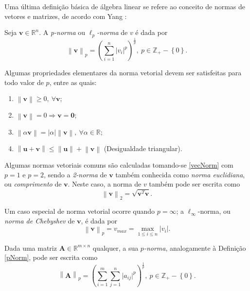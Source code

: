 Uma \'{u}ltima defini\c{c}\~{a}o b\'{a}sica de \'{a}lgebra linear se refere ao conceito de normas de vetores e matrizes, de acordo com Yang \cite{yang}:

\begin{definition} \label{pNorm}
Seja $\mathbf{v} \in \mathbb{R}^{n}$. A \textit{p-norma} ou $\ell_p$\textit{-norma} de $v$ \'{e} dada por
\begin{equation}
	\label{vecNorm}
	\left\|\mathbf{v}\right\|_{p} = \left(\sum_{i=1}^{n}\lvert v_i \rvert ^{p}\right)^{\frac{1}{p}},~p \in \mathbb{Z}_{+} - \left\lbrace 0\right\rbrace.
\end{equation}
\end{definition}
Algumas propriedades elementares da norma vetorial devem ser satisfeitas para todo valor de $p$, entre as quais:
\begin{enumerate}[label=(\alph*)]
\item $\left\|\mathbf{v}\right\| \ge 0 ,~ \forall \mathbf{v}$;
\item $\left\|\mathbf{v}\right\| = 0 \Rightarrow \mathbf{v} = \mathbf{0}$;
\item $\left\|\alpha\mathbf{v}\right\| = \lvert\alpha\rvert \left\|\mathbf{v}\right\|,~ \forall \alpha \in \mathbb{R}$;
\item $\left\|\mathbf{u} + \mathbf{v}\right\| \le \left\|\mathbf{u}\right\| + \left\|\mathbf{v}\right\|$ (Desigualdade triangular).
\end{enumerate}

Algumas normas vetoriais comuns s\~{a}o calculadas tomando-se \eqref{vecNorm} com $p = 1$ e $p = 2$, sendo a \textit{2-norma} de $\mathbf{v}$ tamb\'{e}m conhecida como \textit{norma euclidiana}, ou \textit{comprimento} de $\mathbf{v}$. Neste caso, a norma de $v$ tamb\'{e}m pode ser escrita como
\begin{equation}
	\left\|\mathbf{v}\right\|_{2} = \sqrt{\mathbf{v}^T\mathbf{v}}.
\end{equation} 

Um caso especial de norma vetorial ocorre quando $p = \infty$; a $\ell_{\infty}$-norma, ou \textit{norma de Chebyshev} de $\mathbf{v}$, \'{e} dada por
\begin{equation}
\left\|\mathbf{v}\right\|_{p} = v_{max} = \max_{1 \le i \le n} \lvert v_i \rvert.
\end{equation}

\begin{definition}
Dada uma matriz $\mathbf{A} \in \mathbb{R}^{m \times n}$ qualquer, a sua \textit{$p$-norma}, analogamente \`{a} Defini\c{c}\~{a}o \ref{pNorm}, pode ser escrita como
\begin{equation}
	\label{matNorm}
	\left\|\mathbf{A}\right\|_{p} = \left(\sum_{i=1}^{m} \sum_{j=1}^{n}\lvert a_{ij} \rvert ^{p}\right)^{\frac{1}{p}},~p \in \mathbb{Z}_{+} - \left\lbrace 0\right\rbrace.
\end{equation}
\end{definition} 

